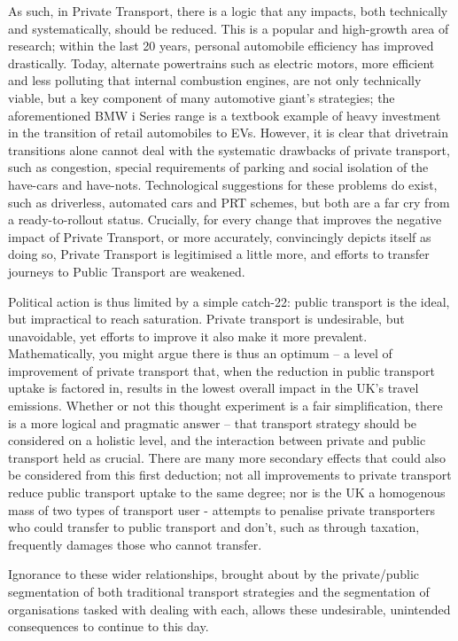 \documentclass[conference]{IEEEtran}
\begin{document}
As such, in Private Transport, there is a logic that any impacts, both
technically and systematically, should be reduced. This is a popular
and high-growth area of research; within the last 20 years, personal
automobile efficiency has improved drastically. Today, alternate
powertrains such as electric motors, more efficient and less polluting
that internal combustion engines, are not only technically viable, but
a key component of many automotive giant’s strategies; the
aforementioned BMW i Series range is a textbook example of heavy
investment in the transition of retail automobiles to EVs. However, it
is clear that drivetrain transitions alone cannot deal with the
systematic drawbacks of private transport, such as congestion, special
requirements of parking and social isolation of the have-cars and
have-nots. Technological suggestions for these problems do exist, such
as driverless, automated cars and PRT schemes, but both are a far cry
from a ready-to-rollout status. Crucially, for every change that
improves the negative impact of Private Transport, or more accurately,
convincingly depicts itself as doing so, Private Transport is
legitimised a little more, and efforts to transfer journeys to Public
Transport are weakened.

Political action is thus limited by a simple catch-22: public
transport is the ideal, but impractical to reach saturation. Private
transport is undesirable, but unavoidable, yet efforts to improve it
also make it more prevalent. Mathematically, you might argue there is
thus an optimum – a level of improvement of private transport that,
when the reduction in public transport uptake is factored in, results
in the lowest overall impact in the UK’s travel emissions. Whether or
not this thought experiment is a fair simplification, there is a more
logical and pragmatic answer – that transport strategy should be
considered on a holistic level, and the interaction between private
and public transport held as crucial. There are many more secondary
effects that could also be considered from this first deduction; not
all improvements to private transport reduce public transport uptake
to the same degree; nor is the UK a homogenous mass of two types of
transport user - attempts to penalise private transporters who could
transfer to public transport and don’t, such as through taxation,
frequently damages those who cannot transfer.

Ignorance to these wider relationships, brought about by the
private/public segmentation of both traditional transport strategies
and the segmentation of organisations tasked with dealing with each,
allows these undesirable, unintended consequences to continue to this
day.
\end{document}

